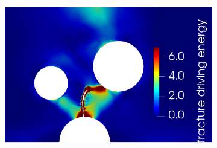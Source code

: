 \begin{figure}[!htb]
\begin{subfigure}{0.23\textwidth}
        \includegraphics[width=\textwidth,scale=0.5]{prelim/figures/model_1_total_3.png}
        \caption{}
    \end{subfigure}


\end{figure}
